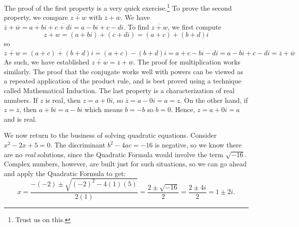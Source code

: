 \documentclass[11pt]{article}
\theoremstyle{definition}  %
\begin{document}
\smallskip

The proof of the first property is a very quick exercise.\footnote{Trust us on this.}  To prove the second property, we compare $\overline{z+w}$ with $\overline{z} + \overline{w}$.  We have $\overline{z} + \overline{w} = \overline{a+bi} + \overline{c+di}  = a-bi + c-di$.  To find $\overline{z+w}$, we first compute \[z+w = (a+bi) + (c+di) = (a+c)+(b+d)i\] so \[\overline{z+w} = \overline{(a+c)+(b+d)i} = (a+c) - (b+d)i = a+c - bi - di = a - bi + c - di = \overline{z} + \overline{w}\]  As such, we have established  $\overline{z+w} = \overline{z}+\overline{w}$. The proof for multiplication works similarly.  The proof that the conjugate works well with powers can be viewed as a repeated application of the product rule, and is best proved using a technique called Mathematical Induction. The last property is a characterization of real numbers.  If $z$ is real, then $z = a + 0i$, so $\overline{z} = a - 0i = a = z$.  On the other hand, if $z=\overline{z}$, then $a+bi = a - bi$ which means $b=-b$ so $b=0$.  Hence, $z = a +0i = a$ and is real.

\medskip

We now return to the business of solving quadratic equations. Consider  $x^2-2x+5 = 0$. The discriminant $b^2 - 4ac = -16$ is negative, so we know  there are no \textit{real} solutions, since the Quadratic Formula would involve the term $\sqrt{-16}$.  Complex numbers, however, are built just for such situations, so we can go ahead and apply the Quadratic Formula to get: \[ x = \dfrac{-(-2) \pm \sqrt{(-2)^2-4(1)(5)}}{2(1)} = \dfrac{2 \pm \sqrt{-16}}{2} = \dfrac{2 \pm 4i}{2} = 1 \pm 2i.\]  
\end{document}
